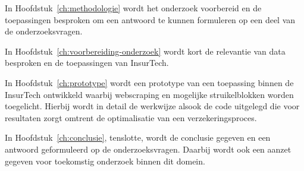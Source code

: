 In Hoofdstuk~\ref{ch:methodologie} wordt het onderzoek voorbereid en de toepassingen besproken om een antwoord te kunnen formuleren op een deel van de onderzoeksvragen.

In Hoofdstuk~\ref{ch:voorbereiding-onderzoek} wordt kort de relevantie van data besproken en de toepassingen van InsurTech.

In Hoofdstuk~\ref{ch:prototype} wordt een prototype van een toepassing binnen de InsurTech ontwikkeld waarbij webscraping en mogelijke struikelblokken worden toegelicht. Hierbij wordt in detail de werkwijze alsook de code uitgelegd die voor resultaten zorgt omtrent de optimalisatie van een verzekeringsproces.

In Hoofdstuk~\ref{ch:conclusie}, tenslotte, wordt de conclusie gegeven en een antwoord geformuleerd op de onderzoeksvragen. Daarbij wordt ook een aanzet gegeven voor toekomstig onderzoek binnen dit domein.